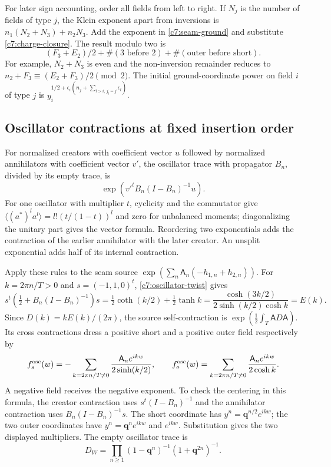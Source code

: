 For later sign accounting, order all fields from left to right.  If $N_j$ is
the number of fields of type $j$, the Klein exponent apart from inversions
is $n_1(N_2+N_3)+n_2N_3$.  Add the exponent in
\eqref{c7:seam-ground} and substitute \eqref{c7:charge-closure}.  The result
modulo two is
\begin{equation}\label{c7:klein-sign}
(F_3+E_2)/2+\#(3\text{ before }2)
                 +\#(\text{outer before short}).
\end{equation}
For example, $N_2+N_3$ is even and the non-inversion remainder reduces to
$n_2+F_3\equiv(E_2+F_3)/2\pmod2$.  The initial ground-coordinate power on
field $i$ of type $j$ is
$y_i^{1/2+\epsilon_i(n_j+\sum_{l>i,\,j_l=j}\epsilon_l)}$.

\subsection{Oscillator contractions at fixed insertion order}

For normalized creators with coefficient vector $u$ followed by normalized
annihilators with coefficient vector $v'$, the oscillator trace with
propagator $B_n$, divided by its empty trace, is
\[
\exp\!\left({v'}^t B_n(I-B_n)^{-1}u\right).
\]
For one oscillator with multiplier $t$, cyclicity and the commutator give
$\langle(a^*)^l a^l\rangle=l!(t/(1-t))^l$ and zero for unbalanced moments;
diagonalizing the unitary part gives the vector formula.  Reordering two
exponentials adds the contraction of the earlier annihilator with the later
creator.  An unsplit exponential adds half of its internal contraction.

Apply these rules to the seam source
$\exp(\sum_n\mathsf A_n(-h_{1,n}+h_{2,n}))$.  For $k=2\pi n/T>0$ and
$s=(-1,1,0)^t$, \eqref{c7:oscillator-twist} gives
\[
s^t\left(\tfrac12+B_n(I-B_n)^{-1}\right)s
=\tfrac12\coth(k/2)+\tfrac12\tanh k
=\frac{\cosh(3k/2)}{2\sinh(k/2)\cosh k}=E(k).
\]
Since $D(k)=kE(k)/(2\pi)$, the source self-contraction is
$\exp(\tfrac12\int_T\mathsf A D\mathsf A)$.  Its cross contractions dress
a positive short and a positive outer field respectively by
\begin{equation}\label{c7:oscillator-dresses}
f_s^{\rm osc}(w)=-\sum_{k=2\pi n/T\ne0}
 \frac{\mathsf A_n e^{ikw}}{2\sinh(k/2)},\qquad
f_o^{\rm osc}(w)=\sum_{k=2\pi n/T\ne0}
 \frac{\mathsf A_n e^{ikw}}{2\cosh k}.
\end{equation}
A negative field receives the negative exponent.  To check the centering in
this formula, the creator contraction uses $s^t(I-B_n)^{-1}$ and the
annihilator contraction uses $B_n(I-B_n)^{-1}s$.  The short coordinate has
$y^n=\mathbf q^{n/2}e^{ikw}$; the two outer coordinates have
$y^n=\mathbf q^ne^{ikw}$ and $e^{ikw}$.  Substitution gives the two displayed
multipliers.  The empty oscillator trace is
\begin{equation}\label{c7:empty-oscillator}
D_W=\prod_{n\ge1}(1-\mathbf q^n)^{-1}(1+\mathbf q^{2n})^{-1}.
\end{equation}

